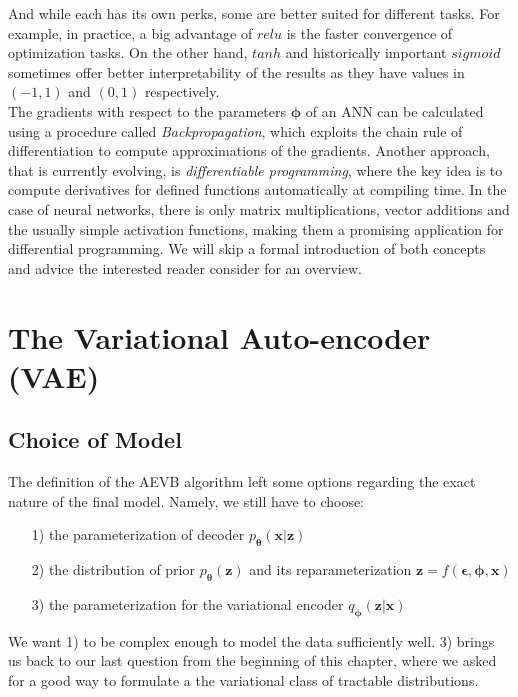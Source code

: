 \documentclass[12pt]{report}
\theoremstyle{definition}
\begin{document}
And while each has its own perks, some are better suited for different tasks. For example, in practice, a big advantage of $relu$ is the faster convergence of optimization tasks. On the other hand, $tanh$ and historically important $sigmoid$ sometimes offer better interpretability of the results as they have values in $(-1, 1)$ and $(0, 1)$ respectively. \\
The gradients with respect to the parameters $\pmb{\phi}$ of an ANN can be calculated using a procedure called \emph{Backpropagation}, which exploits the chain rule of differentiation to compute approximations of the gradients. Another approach, that is currently evolving, is \emph{differentiable programming}, where the key idea is to compute derivatives for defined functions automatically at compiling time. In the case of neural networks, there is only matrix multiplications, vector additions and the usually simple activation functions, making them a promising application for differential programming. We will skip a formal introduction of both concepts and advice the interested reader consider \cite{diff} for an overview.

\section{The Variational Auto-encoder (VAE)}
\subsection{Choice of Model}

The definition of the AEVB algorithm left some options regarding the exact nature of the final model. Namely, we still have to choose:
\begin{itemize}
\item[1)] the parameterization of decoder $p_{\pmb{\theta}}(\mathbf{x}|\mathbf{z})$
\item[2)] the distribution of prior $p_{\pmb{\theta}}(\mathbf{z})$ and its reparameterization $\mathbf{z} = f(\pmb{\epsilon}, \pmb{\phi}, \mathbf{x})$
\item[3)] the parameterization for the variational encoder $q_{\pmb{\phi}}(\mathbf{z}|\mathbf{x})$
\end{itemize}
We want 1) to be complex enough to model the data sufficiently well. 3) brings us back to our last question from the beginning of this chapter, where we asked for a good way to formulate a the variational class of tractable distributions.
\end{document}
